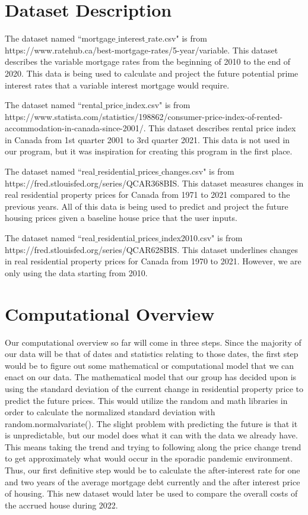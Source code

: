 \documentclass[fontsize=11pt]{article}
\begin{document}
\section*{Dataset Description}
The dataset named ``mortgage$\_$interest$\_$rate.csv" is from https://www.ratehub.ca/best-mortgage-rates/5-year/variable. This dataset describes the variable mortgage rates from the beginning of 2010 to the end of 2020. This data is being used to calculate and project the future potential prime interest rates that a variable interest mortgage would require.

The dataset named ``rental$\_$price$\_$index.csv" is from https://www.statista.com/statistics/198862/consumer-price-index-of-rented-accommodation-in-canada-since-2001/. This dataset describes rental price index in Canada from 1st quarter 2001 to 3rd quarter 2021. This data is not used in our program, but it was inspiration for creating this program in the first place.

The dataset named ``real$\_$residential$\_$prices$\_$changes.csv" is from https://fred.stlouisfed.org/series/QCAR368BIS. This dataset measures changes in real residential property prices for Canada from 1971 to 2021 compared to the previous years. All of this data is being used to predict and project the future housing prices given a baseline house price that the user inputs.

The dataset named ``real$\_$residential$\_$prices$\_$index2010.csv" is from https://fred.stlouisfed.org/series/QCAR628BIS. This dataset underlines changes in real residential property prices for Canada from 1970 to 2021. However, we are only using the data starting from 2010.


\section*{Computational Overview}

Our computational overview so far will come in three steps. Since the majority of our data will be that of dates and statistics relating to those dates, the first step would be to figure out some mathematical or computational model that we can enact on our data. The mathematical model that our group has decided upon is using the standard deviation of the current change in residential property price to predict the future prices. This would utilize the random and math libraries in order to calculate the normalized standard deviation with random.normalvariate(). The slight problem with predicting the future is that it is unpredictable, but our model does what it can with the data we already have. This means taking the trend and trying to following along the price change trend to get approximately what would occur in the sporadic pandemic environment. Thus, our first definitive step would be to calculate the after-interest rate for one and two years of the average mortgage debt currently and the after interest price of housing. This new dataset would later be used to compare the overall costs of the accrued house during 2022.
\end{document}
